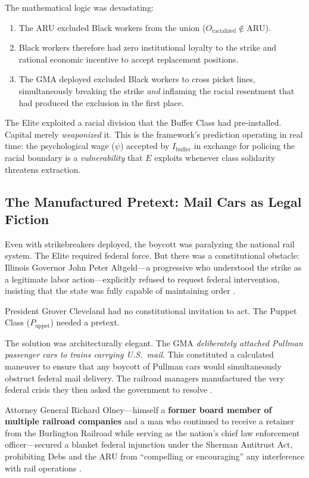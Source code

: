 The mathematical logic was devastating:
\begin{enumerate}
    \item The ARU excluded Black workers from the union ($O_{\text{racialized}} \notin \text{ARU}$).
    \item Black workers therefore had zero institutional loyalty to the strike and rational economic incentive to accept replacement positions.
    \item The GMA deployed excluded Black workers to cross picket lines, simultaneously breaking the strike \textit{and} inflaming the racial resentment that had produced the exclusion in the first place.
\end{enumerate}

The Elite exploited a racial division that the Buffer Class had pre-installed. Capital merely \textit{weaponized} it. This is the framework's prediction operating in real time: the psychological wage ($\psi$) accepted by $I_{\text{buffer}}$ in exchange for policing the racial boundary is a \textit{vulnerability} that $E$ exploits whenever class solidarity threatens extraction.

\subsection{The Manufactured Pretext: Mail Cars as Legal Fiction}

Even with strikebreakers deployed, the boycott was paralyzing the national rail system. The Elite required federal force. But there was a constitutional obstacle: Illinois Governor John Peter Altgeld---a progressive who understood the strike as a legitimate labor action---explicitly refused to request federal intervention, insisting that the state was fully capable of maintaining order \cite{lindsey_pullman}.

President Grover Cleveland had no constitutional invitation to act. The Puppet Class ($P_{\text{uppet}}$) needed a pretext.

The solution was architecturally elegant. The GMA \textit{deliberately attached Pullman passenger cars to trains carrying U.S.\ mail}. This constituted a calculated maneuver to ensure that any boycott of Pullman cars would simultaneously obstruct federal mail delivery. The railroad managers manufactured the very federal crisis they then asked the government to resolve \cite{lindsey_pullman, papke_pullman}.

Attorney General Richard Olney---himself a \textbf{former board member of multiple railroad companies} and a man who continued to receive a retainer from the Burlington Railroad while serving as the nation's chief law enforcement officer---secured a blanket federal injunction under the Sherman Antitrust Act, prohibiting Debs and the ARU from ``compelling or encouraging'' any interference with rail operations \cite{papke_pullman, salvatore_debs}.

